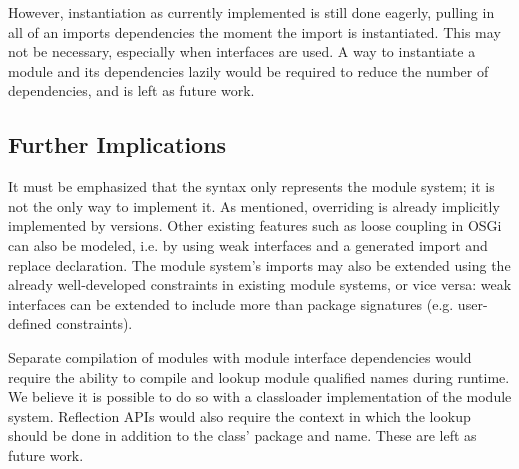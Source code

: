 However, instantiation as currently implemented is still done eagerly, pulling in all
of an imports dependencies the moment the import is instantiated. This may not be necessary,
especially when interfaces are used. A way to instantiate a module and its dependencies 
lazily would be required to reduce the number of dependencies, and is left as future work.

\subsection{Further Implications}

It must be emphasized that the syntax only represents the module system; it is not the only way
to implement it. As mentioned, overriding is already implicitly implemented
by versions. Other existing features such as loose coupling in OSGi can
also be modeled, i.e. by using weak interfaces and a generated import and replace
declaration. The module system's imports may also be extended using the already well-developed
constraints in existing module systems, or vice versa: weak interfaces can be extended
to include more than package signatures (e.g. user-defined constraints).

Separate compilation of modules with module interface dependencies would require
the ability to compile and lookup module qualified names during runtime. We believe
it is possible to do so with a classloader implementation of the module system. Reflection
APIs would also require the context in which the lookup should be done in addition to
the class' package and name. These are left as future work.

